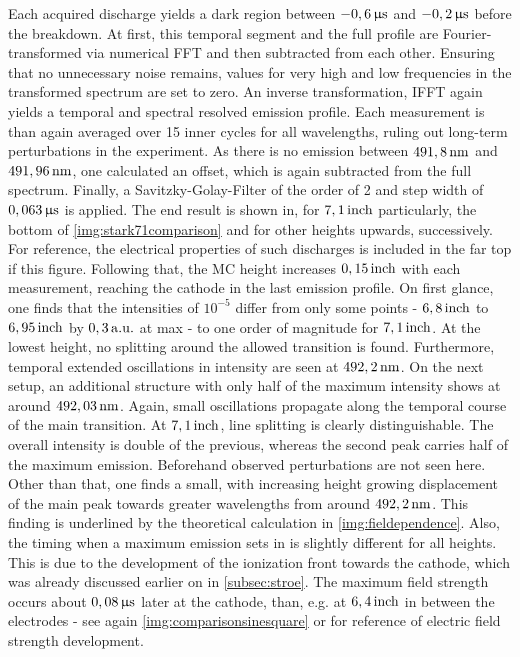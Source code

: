 \documentclass[a4paper,10pt,twoside]{article}
\newcommand{\tenpo}[1]{ 10^{#1}}
\begin{document}
		Each acquired discharge yields a dark region between $\unit[-0,6]{\upmu s}$ and $\unit[-0,2]{\upmu s}$ before the breakdown. At first, this temporal segment and the full profile are Fourier-transformed via numerical FFT and then subtracted from each other. Ensuring that no unnecessary noise remains, values for very high and low frequencies in the transformed spectrum are set to zero. An inverse transformation, IFFT again yields a temporal and spectral resolved emission profile. Each measurement is than again averaged over 15 inner cycles for all wavelengths, ruling out long-term perturbations in the experiment. As there is no emission between $\unit[491,8]{nm}$ and $\unit[491,96]{nm}$, one calculated an offset, which is again subtracted from the full spectrum. Finally, a Savitzky-Golay-Filter of the order of 2 and step width of $\unit[0,063]{\upmu s}$ is applied. The end result is shown in, for $\unit[7,1]{inch}$ particularly, the bottom of \autoref{img:stark71comparison} and for other heights upwards, successively.\\
		For reference, the electrical properties of such discharges is included in the far top if this figure. Following that, the MC height increases $\unit[0,15]{inch}$ with each measurement, reaching the cathode in the last emission profile. On first glance, one finds that the intensities of $\tenpo{-5}$ differ from only some points - $\unit[6,8]{inch}$ to $\unit[6,95]{inch}$ by $\unit[0,3]{a.u.}$ at max - to one order of magnitude for $\unit[7,1]{inch}$. At the lowest height, no splitting around the allowed transition is found. Furthermore, temporal extended oscillations in intensity are seen at $\unit[492,2]{nm}$. On the next setup, an additional structure with only half of the maximum intensity shows at around $\unit[492,03]{nm}$. Again, small oscillations propagate along the temporal course of the main transition. At $\unit[7,1]{inch}$, line splitting is clearly distinguishable. The overall intensity is double of the previous, whereas the second peak carries half of the maximum emission. Beforehand observed perturbations are not seen here.\\			
		Other than that, one finds a small, with increasing height growing displacement of the main peak towards greater wavelengths from around $\unit[492,2]{nm}$. This finding is underlined by the theoretical calculation in \autoref{img:fieldependence}. Also, the timing when a maximum emission sets in is slightly different for all heights. This is due to the development of the ionization front towards the cathode, which was already discussed earlier on in \autoref{subsec:stroe}. The maximum field strength occurs about $\unit[0,08]{\upmu s}$ later at the cathode, than, e.g. at $\unit[6,4]{inch}$ in between the electrodes - see again \autoref{img:comparisonsinesquare} or \cite{elecfielddevelop} for reference of electric field strength development.\\
\end{document}
